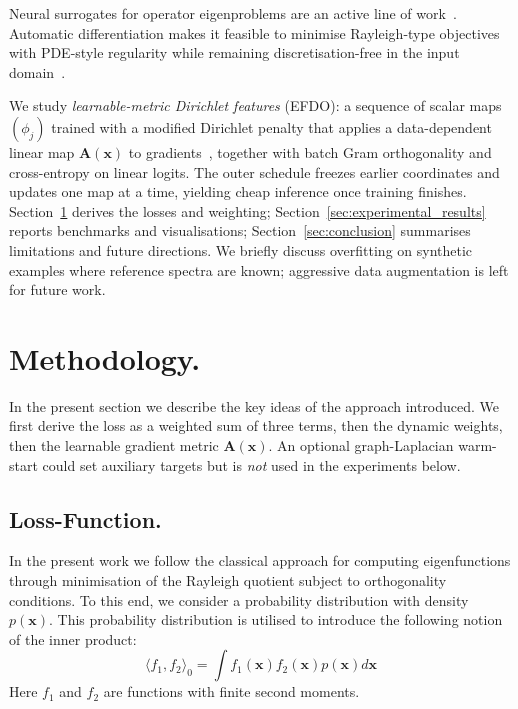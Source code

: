 \documentclass{article}
\theoremstyle{plain}
\theoremstyle{definition}
\theoremstyle{remark}
\begin{document}
Neural surrogates for operator eigenproblems are an active line of work~\citep{Jin2020UnsupervisedNN,pmlr-v162-deng22b,fermionic_neural_network_states}.
Automatic differentiation makes it feasible to minimise Rayleigh-type objectives with PDE-style regularity while remaining discretisation-free in the input domain~\citep{Feld_2019,LAGARIS19971}.

We study \emph{learnable-metric Dirichlet features} (EFDO): a sequence of scalar maps $(\phi_j)$ trained with a modified Dirichlet penalty that applies a data-dependent linear map $\mathbf{A}(\mathbf{x})$ to gradients~\citep{evans2022partial}, together with batch Gram orthogonality and cross-entropy on linear logits.
The outer schedule freezes earlier coordinates and updates one map at a time, yielding cheap inference once training finishes.
Section~\ref{sec:methodology} derives the losses and weighting; Section~\ref{sec:experimental_results} reports benchmarks and visualisations; Section~\ref{sec:conclusion} summarises limitations and future directions.
We briefly discuss overfitting on synthetic examples where reference spectra are known; aggressive data augmentation is left for future work.

\section{Methodology.}
\label{sec:methodology}
In the present section we describe the key ideas of the approach introduced.
We first derive the loss as a weighted sum of three terms, then the dynamic weights, then the learnable gradient metric $\mathbf{A}(\mathbf{x})$.
An optional graph-Laplacian warm-start could set auxiliary targets but is \emph{not} used in the experiments below.

\subsection{Loss-Function.}
\label{subseq:loss_function}
In the present work we follow the classical approach for computing eigenfunctions
through minimisation of the Rayleigh quotient subject to orthogonality conditions.
To this end, we consider a probability distribution with density $p(\mathbf{x})$.
This probability distribution is utilised to introduce the following notion of the inner product:
\begin{equation}
    \label{eq:bilinear_form_0}
    \langle f_1, f_2 \rangle_0 = \int f_1(\mathbf{x}) f_2(\mathbf{x}) p(\mathbf{x}) d\mathbf{x}
\end{equation}
Here $f_1$ and $f_2$ are functions with finite second moments.
\end{document}
